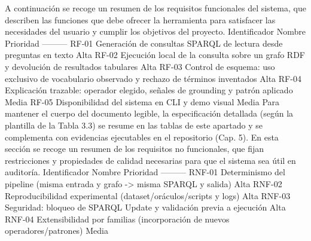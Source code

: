 {}\markdownRendererInterblockSeparator
{}A continuación se recoge un resumen de los requisitos funcionales del sistema, que describen las funciones que debe ofrecer la herramienta para satisfacer las necesidades del usuario y cumplir los objetivos del proyecto.\markdownRendererInterblockSeparator
{}\markdownRendererInterblockSeparator
{}\markdownRendererPipe{} Identificador \markdownRendererPipe{} Nombre \markdownRendererPipe{} Prioridad \markdownRendererPipe{} \markdownRendererPipe{}---\markdownRendererPipe{}---\markdownRendererPipe{}---\markdownRendererPipe{} \markdownRendererPipe{} RF-01 \markdownRendererPipe{} Generación de consultas SPARQL de lectura desde preguntas en texto \markdownRendererPipe{} Alta \markdownRendererPipe{} \markdownRendererPipe{} RF-02 \markdownRendererPipe{} Ejecución local de la consulta sobre un grafo RDF y devolución de resultados tabulares \markdownRendererPipe{} Alta \markdownRendererPipe{} \markdownRendererPipe{} RF-03 \markdownRendererPipe{} Control de esquema: uso exclusivo de vocabulario observado y rechazo de términos inventados \markdownRendererPipe{} Alta \markdownRendererPipe{} \markdownRendererPipe{} RF-04 \markdownRendererPipe{} Explicación trazable: operador elegido, señales de grounding y patrón aplicado \markdownRendererPipe{} Media \markdownRendererPipe{} \markdownRendererPipe{} RF-05 \markdownRendererPipe{} Disponibilidad del sistema en CLI y demo visual \markdownRendererPipe{} Media \markdownRendererPipe{}\markdownRendererInterblockSeparator
{}Para mantener el cuerpo del documento legible, la especificación detallada (según la plantilla de la Tabla 3.3) se resume en las tablas de este apartado y se complementa con evidencias ejecutables en el repositorio (Cap. 5).\markdownRendererInterblockSeparator
{}\markdownRendererInterblockSeparator
{}En esta sección se recoge un resumen de los requisitos no funcionales, que fijan restricciones y propiedades de calidad necesarias para que el sistema sea útil en auditoría.\markdownRendererInterblockSeparator
{}\markdownRendererInterblockSeparator
{}\markdownRendererPipe{} Identificador \markdownRendererPipe{} Nombre \markdownRendererPipe{} Prioridad \markdownRendererPipe{} \markdownRendererPipe{}---\markdownRendererPipe{}---\markdownRendererPipe{}---\markdownRendererPipe{} \markdownRendererPipe{} RNF-01 \markdownRendererPipe{} Determinismo del pipeline (misma entrada y grafo -> misma SPARQL y salida) \markdownRendererPipe{} Alta \markdownRendererPipe{} \markdownRendererPipe{} RNF-02 \markdownRendererPipe{} Reproducibilidad experimental (dataset/oráculos/scripts y logs) \markdownRendererPipe{} Alta \markdownRendererPipe{} \markdownRendererPipe{} RNF-03 \markdownRendererPipe{} Seguridad: bloqueo de SPARQL Update y validación previa a ejecución \markdownRendererPipe{} Alta \markdownRendererPipe{} \markdownRendererPipe{} RNF-04 \markdownRendererPipe{} Extensibilidad por familias (incorporación de nuevos operadores/patrones) \markdownRendererPipe{} Media \markdownRendererPipe{}\markdownRendererInterblockSeparator

